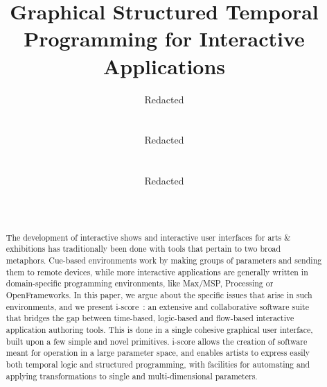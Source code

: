 \documentclass{sigchi}
\begin{document}
\title{Graphical Structured Temporal Programming for Interactive Applications}

\author{
  \alignauthor Redacted\\
    \\
    \\
  \alignauthor Redacted\\
    \\
    \\
  \alignauthor Redacted\\
    \\
    \\
}

\maketitle

\begin{abstract}
  The development of interactive shows and interactive user interfaces for arts \& exhibitions
has traditionally been done with tools that pertain to two broad metaphors. 
Cue-based environments work by making groups of parameters and sending them to remote devices, 
while more interactive applications are generally written in domain-specific 
programming environments, like Max/MSP, Processing or OpenFrameworks.
  In this paper, we argue about the specific issues that arise in such environments, and we present 
i-score~: an extensive and collaborative software suite that bridges
the gap between time-based, logic-based and flow-based interactive application authoring tools. 
This is done in a single cohesive graphical user interface, built upon a few simple and novel primitives.
  i-score allows the creation of software meant for operation in a large parameter space, 
and enables artists to express easily both temporal logic and structured programming, 
with facilities for automating and applying transformations to single and multi-dimensional parameters.
\end{abstract}

\end{document}
